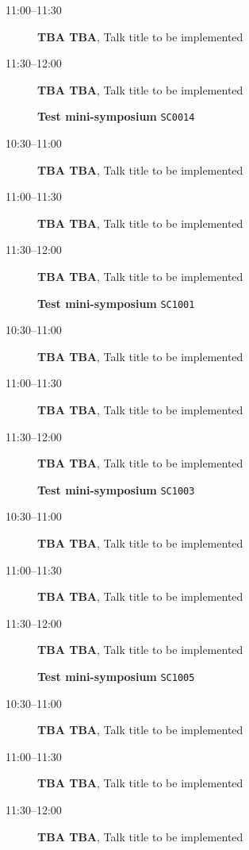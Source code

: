 \documentclass[ILAS2025-program.tex]{subfiles}
\begin{document}
\begin{description}
\begin{description}
        \item[11:00--11:30] \textbf{TBA TBA}, Talk title to be implemented
        \item[11:30--12:00] \textbf{TBA TBA}, Talk title to be implemented
        \end{description}
    \begin{description}
    \item[] \textbf{Test mini-symposium} {\footnotesize\texttt{SC0014}}
    \item[10:30--11:00] \textbf{TBA TBA}, Talk title to be implemented
        \item[11:00--11:30] \textbf{TBA TBA}, Talk title to be implemented
        \item[11:30--12:00] \textbf{TBA TBA}, Talk title to be implemented
        \end{description}
    \begin{description}
    \item[] \textbf{Test mini-symposium} {\footnotesize\texttt{SC1001}}
    \item[10:30--11:00] \textbf{TBA TBA}, Talk title to be implemented
        \item[11:00--11:30] \textbf{TBA TBA}, Talk title to be implemented
        \item[11:30--12:00] \textbf{TBA TBA}, Talk title to be implemented
        \end{description}
    \begin{description}
    \item[] \textbf{Test mini-symposium} {\footnotesize\texttt{SC1003}}
    \item[10:30--11:00] \textbf{TBA TBA}, Talk title to be implemented
        \item[11:00--11:30] \textbf{TBA TBA}, Talk title to be implemented
        \item[11:30--12:00] \textbf{TBA TBA}, Talk title to be implemented
        \end{description}
    \begin{description}
    \item[] \textbf{Test mini-symposium} {\footnotesize\texttt{SC1005}}
    \item[10:30--11:00] \textbf{TBA TBA}, Talk title to be implemented
        \item[11:00--11:30] \textbf{TBA TBA}, Talk title to be implemented
        \item[11:30--12:00] \textbf{TBA TBA}, Talk title to be implemented
        \end{description}

\end{description}
\end{document}
